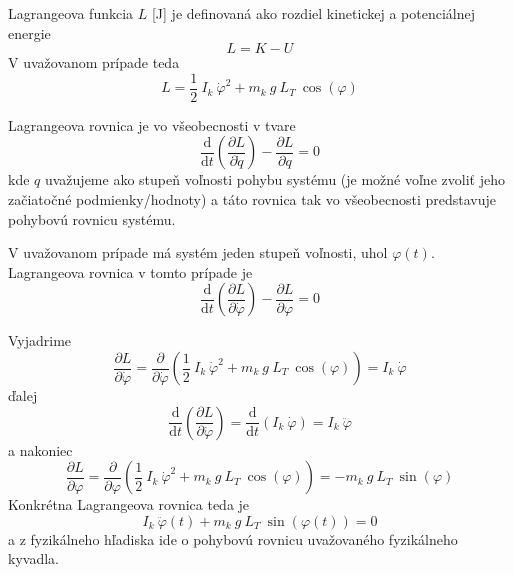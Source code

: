 \documentclass[a4paper, 10pt, ]{article}
\begin{document}
Lagrangeova funkcia $L$ [J] je definovaná ako rozdiel kinetickej a potenciálnej energie
\begin{equation}
    L = K - U
\end{equation}
V uvažovanom prípade teda
\begin{equation}
    L = \frac{1}{2} \  I_k \  \dot\varphi^2 + m_k \  g \   L_T \  \cos(\varphi)
\end{equation}

Lagrangeova rovnica je vo všeobecnosti v tvare
\begin{equation} \label{lagrangeovaRovnica}
    \frac{\text{d}}{\text{d}t} \left( \frac{\partial L}{\partial \dot{q}} \right) - \frac{\partial L}{\partial q} = 0
\end{equation}
kde $q$ uvažujeme ako stupeň voľnosti pohybu systému (je možné voľne zvoliť jeho začiatočné podmienky/hodnoty) a táto rovnica tak vo všeobecnosti predstavuje pohybovú rovnicu systému. 

V uvažovanom prípade má systém jeden stupeň voľnosti, uhol $\varphi(t)$. Lagrangeova rovnica v tomto prípade je
\begin{equation}
    \frac{\text{d}}{\text{d}t} \left( \frac{\partial L}{\partial \dot{\varphi}} \right) - \frac{\partial L}{\partial \varphi} = 0
\end{equation}

Vyjadrime
\begin{equation}
    \frac{\partial L}{\partial \dot{\varphi}} = \frac{\partial}{\partial \dot{\varphi}} \left( \frac{1}{2} \  I_k \  \dot\varphi^2 + m_k \  g \   L_T \  \cos(\varphi) \right) = I_k \  \dot\varphi
\end{equation}
ďalej
\begin{equation}
    \frac{\text{d}}{\text{d}t} \left( \frac{\partial L}{\partial \dot{\varphi}} \right) = \frac{\text{d}}{\text{d}t} \left( I_k \  \dot\varphi \right) = I_k \  \ddot\varphi
\end{equation}
a nakoniec
\begin{equation}
    \frac{\partial L}{\partial \varphi} = \frac{\partial}{\partial \varphi} \left( \frac{1}{2} \  I_k \  \dot\varphi^2 + m_k \  g \   L_T \  \cos(\varphi) \right) = - m_k \  g \   L_T \  \sin(\varphi)
\end{equation}
Konkrétna Lagrangeova rovnica teda je
\begin{equation} \label{pohybovaRovnicaKyvadla}
    I_k \  \ddot\varphi(t) + m_k \  g \   L_T \  \sin(\varphi(t)) = 0
\end{equation}
a z fyzikálneho hľadiska ide o pohybovú rovnicu uvažovaného fyzikálneho kyvadla.
\end{document}
